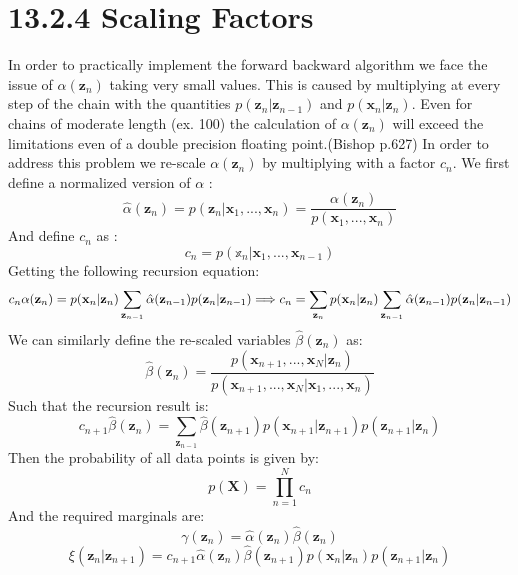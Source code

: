 \documentclass[11pt]{article}
\begin{document}
\section{13.2.4 Scaling Factors}
In order to practically implement the forward backward algorithm we face the issue of $\alpha(\mathbf{z}_n)$ taking very small values. This is caused by multiplying at every step of the chain with the quantities $p(\mathbf{z}_n | \mathbf{z}_{n-1})$ and $p(\mathbf{x}_n | \mathbf{z}_n)$. Even for chains of moderate length (ex. 100) the calculation of $\alpha(\mathbf{z}_n)$ will exceed the limitations even of a double precision floating point.(Bishop p.627)
In order to address this problem  we re-scale $\alpha(\mathbf{z}_n)$ by multiplying with a factor $c_n$. We first define a normalized version of $\alpha$ :
\begin{equation*}
\hat{\alpha}(\mathbf{z}_n) = p(\mathbf{z}_n | \mathbf{x}_1 ,..., \mathbf{x}_{n}) = \frac{\alpha(\mathbf{z}_n)}{ p(\mathbf{x}_1 ,..., \mathbf{x}_{n})} 
\end{equation*}
And define $c_n$ as :
\begin{equation*}
c_n = p(\mathbb{x}_n|\mathbf{x}_1 ,..., \mathbf{x}_{n-1})
\end{equation*}
Getting the following recursion equation:\\
\begin{equation*}
c_n  \alpha(\mathbf{z}_n) = p(\mathbf{x}_n|\mathbf{z}_n) \sum_{\mathbf{z}_{n-1}} \hat{\alpha}(\mathbf{z}_{n-1}) p(\mathbf{z}_{n}|\mathbf{z}_{n-1}) \Longrightarrow\\
c_n = \sum_{\mathbf{z}_{n}} p(\mathbf{x}_n|\mathbf{z}_n) \sum_{\mathbf{z}_{n-1}} \hat{\alpha}(\mathbf{z}_{n-1}) p(\mathbf{z}_{n}|\mathbf{z}_{n-1})
\end{equation*}
We can similarly define the re-scaled variables $\hat{\beta}(\mathbf{z}_n)$ as:
\begin{equation*}
\hat{\beta}(\mathbf{z}_n) = \frac{ p(\mathbf{x}_{n+1} ,..., \mathbf{x}_{N}|\mathbf{z}_n)}{p(\mathbf{x}_{n+1} ,..., \mathbf{x}_{N}|\mathbf{x}_{1} ,..., \mathbf{x}_{n})}
\end{equation*}
Such that the recursion result is:
\begin{equation*}
 c_{n+1} \hat{\beta}(\mathbf{z}_n) = \sum_{\mathbf{z}_{n-1}}  \hat{\beta}(\mathbf{z}_{n+1}) p(\mathbf{x}_{n+1}|\mathbf{z}_{n+1}) p(\mathbf{z}_{n+1}|\mathbf{z}_{n})
\end{equation*}
Then the probability of all data points is given by:
\begin{equation*}
p(\mathbf{X}) = \prod_{n=1}^N c_n
\end{equation*}
And the required marginals are:
\begin{equation*}
\gamma(\mathbf{z}_{n}) = \hat{\alpha}(\mathbf{z}_n) \hat{\beta}(\mathbf{z}_n)
\end{equation*}
\begin{equation*}
\xi(\mathbf{z}_{n}|\mathbf{z}_{n+1}) = c_{n+1}   \hat{\alpha}(\mathbf{z}_n)  \hat{\beta}(\mathbf{z}_{n+1})  p(\mathbf{x}_n|\mathbf{z}_n)  p(\mathbf{z}_{n+1}|\mathbf{z}_{n})
\end{equation*}
\end{document}
